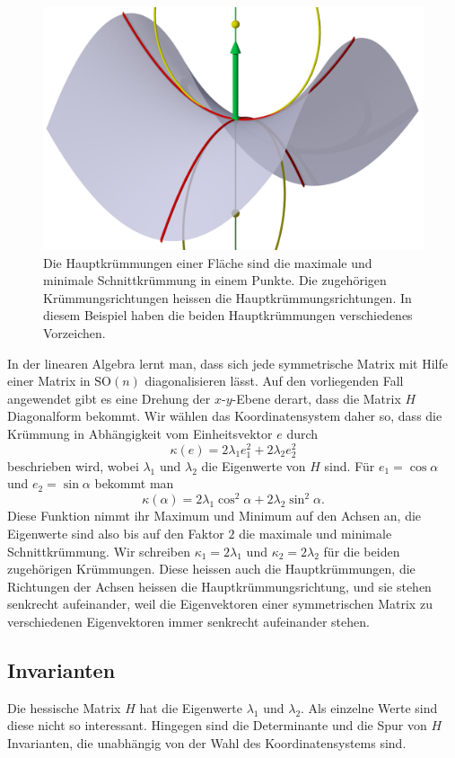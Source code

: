 \begin{figure}
\centering
\includegraphics[width=\hsize]{chapters/3d/hauptkruemmungen.jpg}
\caption{Die Hauptkrümmungen einer Fläche sind die maximale und minimale
Schnittkrümmung in einem Punkte.
Die zugehörigen Krümmungsrichtungen heissen die Hauptkrümmungsrichtungen.
In diesem Beispiel haben die beiden Hauptkrümmungen verschiedenes Vorzeichen.
\label{skript:kurven:hauptkruemmungen}}
\end{figure}

In der linearen Algebra lernt man, dass sich jede symmetrische Matrix 
mit Hilfe einer Matrix in $\textrm{SO}(n)$ diagonalisieren lässt.
Auf den vorliegenden Fall angewendet gibt es eine Drehung der
$x$-$y$-Ebene derart, dass
die Matrix $H$ Diagonalform bekommt.
Wir wählen das Koordinatensystem daher so, dass die
Krümmung in Abhängigkeit vom Einheitsvektor $e$ durch
\[
\kappa(e)
=
2\lambda_1 e_1^2 + 2\lambda_2 e_2^2
\]
beschrieben wird,
wobei $\lambda_1$ und $\lambda_2$ die Eigenwerte von $H$ sind.
Für $e_1=\cos\alpha$ und $e_2=\sin\alpha$ bekommt man
\[
\kappa(\alpha)
=
2\lambda_1 \cos^2\alpha + 2\lambda_2 \sin^2\alpha.
\]
Diese Funktion nimmt ihr Maximum und Minimum auf den Achsen an,
die Eigenwerte sind also bis auf den Faktor $2$ die maximale und minimale
Schnittkrümmung.
Wir schreiben $\kappa_1=2\lambda_1$ und $\kappa_2=2\lambda_2$ für die
beiden zugehörigen Krümmungen.
%
Diese heissen auch die Hauptkrümmungen, die Richtungen der Achsen heissen
die Hauptkrümmungsrichtung, und sie stehen senkrecht aufeinander, weil
%
die Eigenvektoren einer symmetrischen Matrix zu verschiedenen Eigenvektoren
immer senkrecht aufeinander stehen.

\subsection{Invarianten}
Die hessische Matrix $H$ hat die Eigenwerte $\lambda_1$ und $\lambda_2$.
Als einzelne Werte sind diese nicht so interessant.
Hingegen sind die Determinante und die Spur von $H$ Invarianten, die
unabhängig von der Wahl des Koordinatensystems sind.

